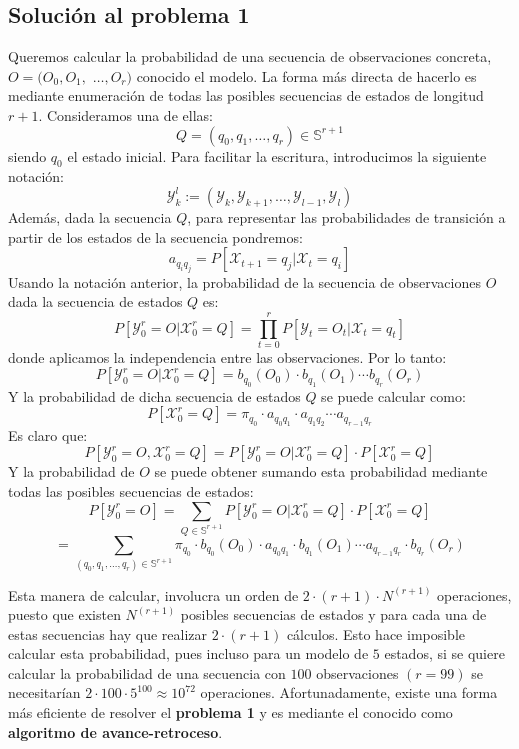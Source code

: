 \subsection{Solución al problema 1}
Queremos calcular la probabilidad de una secuencia de observaciones concreta, $O=(O_0,O_1,$ $\dots, O_r)$ conocido el modelo. La forma más directa de hacerlo es mediante enumeración de todas las posibles secuencias de estados de longitud $r+1$. Consideramos una de ellas:
\[Q=(q_0 , q_1 , \dots , q_r)\in\mathbb{S}^{r+1}\]
siendo $q_0$ el estado inicial. Para facilitar la escritura, introducimos la siguiente notación:
\[\mathcal{Y}_k^l:=(\mathcal{Y}_{k},\mathcal{Y}_{k+1},\dots,\mathcal{Y}_{l-1},\mathcal{Y}_{l})\]
Además, dada la secuencia $Q$, para representar las probabilidades de transición a partir de los estados de la secuencia pondremos:
\[a_{q_iq_j}=P[\mathcal{X}_{t+1}=q_j|\mathcal{X}_t=q_i]\]
Usando la notación anterior, la probabilidad de la secuencia de observaciones $O$ dada la secuencia de estados $Q$ es:
\[P[\mathcal{Y}_0^r=O|\mathcal{X}_0^r=Q]=\prod_{t=0}^r P[\mathcal{Y}_{t}=O_t|\mathcal{X}_{t}=q_t]\]
donde aplicamos la independencia entre las observaciones. Por lo tanto:
\[P[\mathcal{Y}_0^r=O|\mathcal{X}_0^r=Q]=b_{q_0}(O_0)\cdot b_{q_1}(O_1)\cdots b_{q_r}(O_r)\]
Y la probabilidad de dicha secuencia de estados $Q$ se puede calcular como:
\[P[\mathcal{X}_0^r=Q]=\pi_{q_0}\cdot a_{q_0q_1}\cdot a_{q_1q_2}\cdots a_{q_{r-1}q_r} \]
Es claro que:
\[P[\mathcal{Y}_0^r=O,\mathcal{X}_0^r=Q]=P[\mathcal{Y}_0^r=O|\mathcal{X}_0^r=Q]\cdot P[\mathcal{X}_0^r=Q] \]
Y la probabilidad de $O$ se puede obtener sumando esta probabilidad mediante todas las posibles secuencias de estados:
\[P[\mathcal{Y}_0^r=O]=\sum_{Q\in\mathbb{S}^{r+1}}P[\mathcal{Y}_0^r=O|\mathcal{X}_0^r=Q]\cdot P[\mathcal{X}_0^r=Q]\]
\[=\sum_{(q_0 , q_1 , \dots , q_r)\in\mathbb{S}^{r+1}}\pi_{q_0}\cdot b_{q_0}(O_0)\cdot a_{q_0q_1}\cdot b_{q_1}(O_1)\cdots a_{q_{r-1}q_r}\cdot b_{q_r}(O_r)\]

Esta manera de calcular, involucra un orden de $2\cdot(r+1)\cdot N^{(r+1)}$ operaciones, puesto que existen $N^{(r+1)}$ posibles secuencias de estados y para cada una de estas secuencias hay que realizar $2\cdot(r+1)$ cálculos. Esto hace imposible calcular esta probabilidad, pues incluso para un modelo de $5$ estados, si se quiere calcular la probabilidad de una secuencia con $100$ observaciones $(r=99)$ se necesitarían $2\cdot100\cdot5^{100}\approx10^{72}$ operaciones. Afortunadamente, existe una forma más eficiente de resolver el \textbf{problema 1} y es mediante el conocido como \textbf{algoritmo de avance-retroceso}. 

